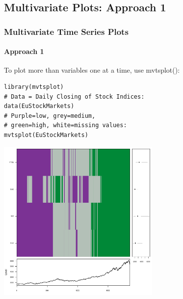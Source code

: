 

\subsection{Multivariate Plots: Approach 1}


\begin{frame}
 \frametitle{Multivariate Time Series Plots}
 \framesubtitle{Approach 1}

To plot more than variables one at a time, use \ttfamily mvtsplot()\normalfont [5]:
		\begin{lstlisting}
library(mvtsplot)		
# Data = Daily Closing of Stock Indices:
data(EuStockMarkets)
# Purple=low, grey=medium, 
# green=high, white=missing values:
mvtsplot(EuStockMarkets)
		\end{lstlisting}

       \begin{center}
         \includegraphics[width=0.6\textwidth]{images/Mtvsplot1.pdf}
        \end{center}

\end{frame}


